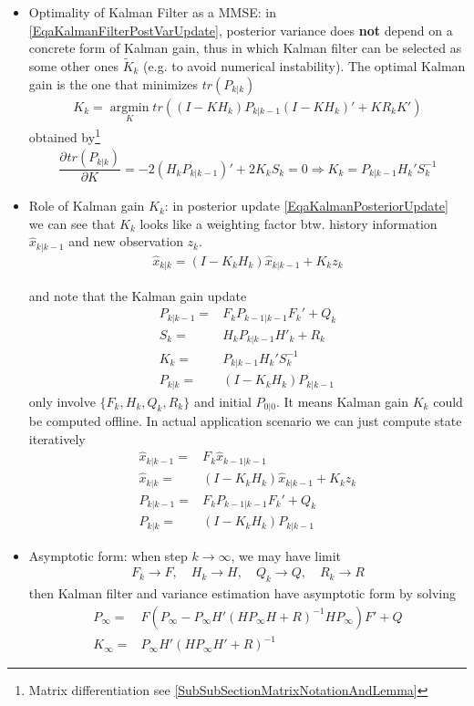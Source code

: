 \begin{itemize}[topsep=2pt,itemsep=0pt]
    \item Optimality of Kalman Filter as a MMSE: in \autoref{EqaKalmanFilterPostVarUpdate}, posterior variance does \textbf{not} depend on a concrete form of Kalman gain, thus in which Kalman filter  can be selected as some other ones $ \tilde{K}_k $ (e.g. to avoid numerical instability). The optimal Kalman gain is the one that minimizes $ tr\left(P_{k|k}\right) $
    \begin{align}
        K_k=\mathop{\arg\min}\limits_{K}tr\left( (I-KH_k)P_{k|k-1}(I-KH_k)'+KR_kK' \right)
    \end{align}
    obtained by\footnote{Matrix differentiation see \autoref{SubSubSectionMatrixNotationAndLemma}}
    \begin{align}
        \dfrac{\partial^{} tr\left(P_{k|k}\right)}{\partial K ^{}}= -2\left(H_kP_{k|k-1}\right)'+2K_kS_k=0\Rightarrow K_k=P_{k|k-1}H_k'S_k^{-1}
    \end{align}

    \item Role of Kalman gain $ K_k $: in posterior update \autoref{EqaKalmanPosteriorUpdate} we can see that $ K_k $ looks like a weighting factor btw. history information $ \hat{x}_{k|k-1} $ and new observation $ z_k $.
    \begin{align}
        \hat{x}_{k|k}=\left(I-K_kH_k\right)\hat{x}_{k|k-1}+K_kz_k 
    \end{align}

    and note that the Kalman gain update
    \begin{align}
        P_{k|k-1}=&F_kP_{k-1|k-1}F_k'+Q_k\\
        S_k=&H_kP_{k|k-1}H'_k+R_k\\
        K_k=&P_{k|k-1}H_k'S_k^{-1}\\
        P_{k|k}=&(I-K_kH_k)P_{k|k-1}
    \end{align}
    only involve $ \{F_k,H_k,Q_k,R_k\} $ and initial $ P_{0|0}$. It means Kalman gain $ K_k $ could be computed offline. In actual application scenario we can just compute state iteratively
    \begin{align}
        \hat{x}_{k|k-1}=&F_k\hat{x}_{k-1|k-1}\\
        \hat{x}_{k|k}=&\left(I-K_kH_k\right)\hat{x}_{k|k-1}+K_kz_k\\
        P_{k|k-1}=&F_kP_{k-1|k-1}F_k'+Q_k\\
        P_{k|k}=&\left(I-K_kH_k\right)P_{k|k-1}
    \end{align}
    \item Asymptotic form: when step $ k\to\infty $, we may have limit
    \begin{align}
        F_k\to F ,\quad H_k\to H,\quad Q_k\to Q ,\quad R_k\to R 
    \end{align}
    then Kalman filter and variance estimation have asymptotic form by solving
    \begin{align}
        P_{\infty}=&F \left(P_\infty-P_\infty H'\left(H P_\infty H
        +R \right)^{-1}H P_\infty\right)F '+Q \\
        K_\infty = &P_\infty H '\left(H P_\infty H '+R\right)^{-1}
    \end{align}


\end{itemize}
